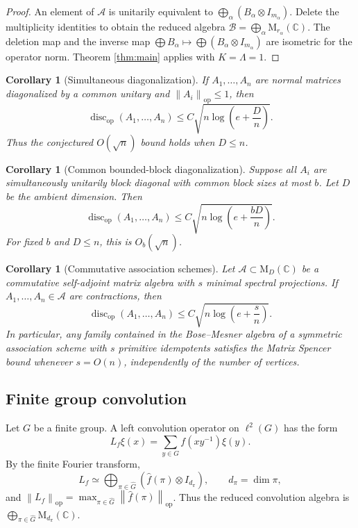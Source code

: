\documentclass[11pt]{amsart}
\numberwithin{equation}{section}
\newtheorem{corollary}[theorem]{Corollary}
\theoremstyle{definition}
\theoremstyle{remark}
\newcommand{\C}{\mathbb C}
\newcommand{\M}{\mathrm M}
\newcommand{\op}{\mathrm{op}}
\newcommand{\discop}{\operatorname{disc}_{\op}}
\newcommand{\norm}[1]{\left\lVert #1\right\rVert}
\newcommand{\mcA}{\mathcal A}
\newcommand{\mcB}{\mathcal B}
\begin{document}
\begin{proof}
An element of $\mcA$ is unitarily equivalent to
$\bigoplus_\alpha(B_\alpha\otimes I_{m_\alpha})$. Delete the multiplicity
identities to obtain the reduced algebra
$\mcB=\bigoplus_\alpha\M_{r_\alpha}(\C)$. The deletion map and the inverse map
$\bigoplus B_\alpha\mapsto\bigoplus(B_\alpha\otimes I_{m_\alpha})$ are isometric
for the operator norm. Theorem \ref{thm:main} applies with
$K=\Lambda=1$.
\end{proof}

\begin{corollary}[Simultaneous diagonalization]
If $A_1,\ldots,A_n$ are normal matrices diagonalized by a common unitary and
$\norm{A_i}_{\op}\le 1$, then
\[
\discop(A_1,\ldots,A_n)
\le C\sqrt{n\log\left(e+\frac{D}{n}\right)} .
\]
Thus the conjectured $O(\sqrt n)$ bound holds when $D\le n$.
\end{corollary}

\begin{corollary}[Common bounded-block diagonalization]
Suppose all $A_i$ are simultaneously unitarily block diagonal with common block
sizes at most $b$. Let $D$ be the ambient dimension. Then
\[
\discop(A_1,\ldots,A_n)
\le C\sqrt{n\log\left(e+\frac{bD}{n}\right)} .
\]
For fixed $b$ and $D\le n$, this is $O_b(\sqrt n)$.
\end{corollary}

\begin{corollary}[Commutative association schemes]
Let $\mcA\subset\M_D(\C)$ be a commutative self-adjoint matrix algebra with $s$
minimal spectral projections. If $A_1,\ldots,A_n\in\mcA$ are contractions, then
\[
\discop(A_1,\ldots,A_n)
\le C\sqrt{n\log\left(e+\frac{s}{n}\right)} .
\]
In particular, any family contained in the Bose--Mesner algebra of a symmetric
association scheme with $s$ primitive idempotents satisfies the Matrix Spencer
bound whenever $s=O(n)$, independently of the number of vertices.
\end{corollary}

\subsection{Finite group convolution}

Let $G$ be a finite group. A left convolution operator on $\ell^2(G)$ has the
form
\[
L_f\xi(x)=\sum_{y\in G} f(xy^{-1})\xi(y).
\]
By the finite Fourier transform,
\[
L_f \simeq \bigoplus_{\pi\in\widehat G}
\left(\widehat f(\pi)\otimes I_{d_\pi}\right),
\qquad d_\pi=\dim\pi,
\]
and
$\norm{L_f}_{\op}=\max_{\pi\in\widehat G}\norm{\widehat f(\pi)}_{\op}$.
Thus the reduced convolution algebra is
$\bigoplus_{\pi\in\widehat G}\M_{d_\pi}(\C)$.
\end{document}
